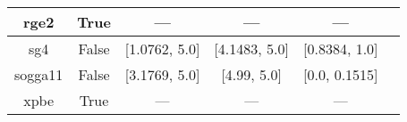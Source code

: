 \begin{tabular}{|c|c|c|c|c|l|}
    rge2 &                  True &              --- &           --- &            --- &                             \cite{Ruzsinszky2009_763} \\ \hline
     sg4 &                 False &    [1.0762, 5.0] & [4.1483, 5.0] &  [0.8384, 1.0] &                          \cite{Constantin2016_045126} \\ \hline
 sogga11 &                 False &    [3.1769, 5.0] &   [4.99, 5.0] &  [0.0, 0.1515] &                              \cite{Peverati2011_1991} \\ \hline
    xpbe &                  True &              --- &           --- &            --- &                                    \cite{Xu2004_4068} \\ \hline
\end{tabular}